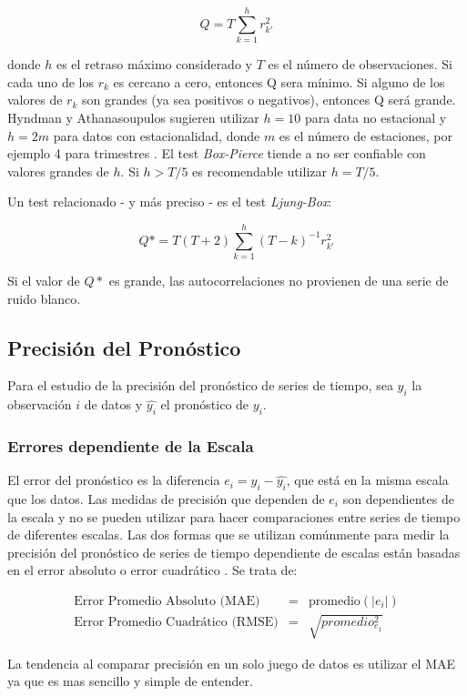 \[ Q = T \sum_{k=1}^{h}r_{k\prime}^2 \]

donde $h$ es el retraso máximo considerado y $T$ es el número de observaciones. Si cada uno de los $r_k$ es cercano a cero, entonces Q sera mínimo. Si alguno de los valores de $r_k$ son grandes (ya sea positivos o negativos), entonces Q será grande. Hyndman y Athanasoupulos sugieren utilizar $h = 10$ para data no estacional y $h = 2m$ para datos con estacionalidad, donde $m$ es el número de estaciones, por ejemplo 4 para trimestres \cite{hyndman}.  El test \emph{Box-Pierce} tiende a no ser confiable con valores grandes de $h$. Si $h > T/5$ es recomendable utilizar $h=T/5$.

Un test relacionado - y más preciso - es el test \emph{Ljung-Box}:

\[ Q* = T(T+2) \sum_{k=1}^{h}(T-k)^{-1}r_{k\prime}^{2} \]

Si el valor de $Q*$ es grande, las autocorrelaciones no provienen de una serie de ruido blanco.

\subsection{Precisión del Pronóstico}
Para el estudio de la precisión del pronóstico de series de tiempo, sea $y_i$ la observación $i$ de datos y $\hat{y_i}$ el pronóstico de $y_i$.

\subsubsection{Errores dependiente de la Escala}
El error del pronóstico es la diferencia $e_i = y_i - \hat{y_i}$, que está en la misma escala que los datos. Las medidas de precisión que dependen de $e_i$ son dependientes de la escala y no se pueden utilizar para hacer comparaciones entre series de tiempo de diferentes escalas. Las dos formas que se utilizan comúnmente para medir la precisión del pronóstico de series de tiempo dependiente de escalas están basadas en el error absoluto o error cuadrático \cite{hyndman}. Se trata de:

\begin{eqnarray*}
	\text{Error Promedio Absoluto (MAE)}& = &\text{promedio}(|e_{i}|) \\
	\text{Error Promedio Cuadrático (RMSE)}& = &\sqrt{promedio_{e_1}^2}
\end{eqnarray*}

La tendencia al comparar precisión en un solo juego de datos es utilizar el MAE ya que es mas sencillo y simple de entender.

